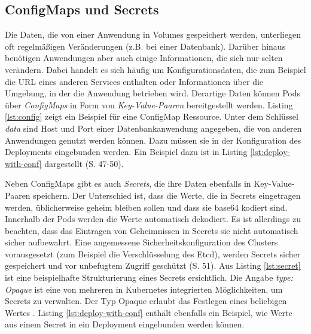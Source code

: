 \documentclass[11pt,a4paper]{article}
\begin{document}
\subsection{ConfigMaps und Secrets}
Die Daten, die von einer Anwendung in Volumes gespeichert werden, unterliegen oft regelmäßigen Veränderungen
(z.B. bei einer Datenbank). Darüber hinaus benötigen Anwendungen aber auch einige Informationen, die sich nur
selten verändern. Dabei handelt es sich häufig um Konfigurationsdaten, die zum Beispiel die URL eines anderen
Services enthalten oder Informationen über die Umgebung, in der die Anwendung betrieben wird.
Derartige Daten können Pods über \emph{ConfigMaps} in Form von \emph{Key-Value-Paaren} bereitgestellt werden.
Listing \ref{lst:config} zeigt ein Beispiel für eine ConfigMap Ressource.
Unter dem Schlüssel \emph{data} sind Host und Port einer Datenbankanwendung angegeben,
die von anderen Anwendungen genutzt werden können. Dazu müssen sie in der Konfiguration des
Deployments eingebunden werden. Ein Beispiel dazu ist in Listing \ref{lst:deploy-with-conf} dargestellt \cite{Schmeling_Dargatz_2022} (S. 47-50).

% 


Neben ConfigMaps gibt es auch \emph{Secrets}, die ihre Daten ebenfalls in Key-Value-Paaren speichern.
Der Unterschied ist, dass die Werte, die in Secrets eingetragen werden, üblicherweise geheim bleiben sollen und
dass sie base64 \cite{rfc4648} kodiert sind. Innerhalb der Pods werden die Werte automatisch dekodiert.
Es ist allerdings zu beachten, dass das Eintragen von Geheimnissen in Secrets sie nicht automatisch sicher
aufbewahrt.
Eine angemessene Sicherheitskonfiguration des Clusters vorausgesetzt (zum Beispiel die Verschlüsselung des Etcd),
werden Secrets sicher gespeichert und vor unbefugtem Zugriff geschützt \cite{Schmeling_Dargatz_2022} (S. 51).
Aus Listing \ref{lst:secret} ist eine beispielhafte Strukturierung eines Secrets ersichtlich.
Die Angabe \emph{type: Opaque} ist eine von mehreren in Kubernetes integrierten Möglichkeiten,
um Secrets zu verwalten. Der Typ Opaque erlaubt das Festlegen eines beliebigen Wertes \cite{kubernetes.io_secret_types}.
Listing \ref{lst:deploy-with-conf} enthält ebenfalls ein Beispiel, wie Werte aus einem
Secret in ein Deployment eingebunden werden können.
\end{document}
